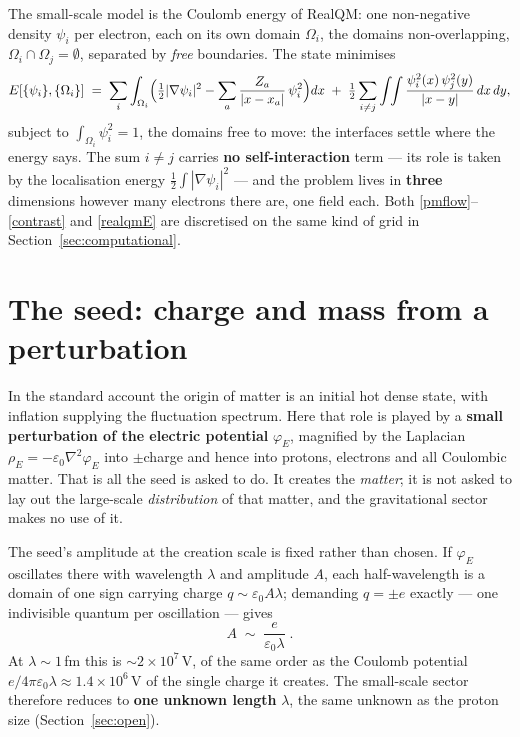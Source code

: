 \documentclass[11pt]{article}
\newcommand{\grad}{\nabla}
\newcommand{\half}{\tfrac{1}{2}}
\begin{document}
The small-scale model is the Coulomb energy of RealQM: one non-negative density $\psi_i$ per electron, each on its
own domain $\Omega_i$, the domains non-overlapping, $\Omega_i\cap\Omega_j=\emptyset$, separated by \emph{free}
boundaries. The state minimises
\begin{equation}\label{realqmE}
E[\{\psi_i\},\{\Omega_i\}]\;=\;\sum_i\int_{\Omega_i}\Bigl(\half|\grad\psi_i|^2-\sum_a\frac{Z_a}{|x-x_a|}\,
\psi_i^2\Bigr)dx\;+\;\half\sum_{i\neq j}\int\!\!\int\frac{\psi_i^2(x)\,\psi_j^2(y)}{|x-y|}\,dx\,dy ,
\end{equation}
subject to $\int_{\Omega_i}\psi_i^2=1$, the domains free to move: the interfaces settle where the energy says. The
sum $i\neq j$ carries \textbf{no self-interaction} term --- its role is taken by the localisation energy
$\half\int|\grad\psi_i|^2$ --- and the problem lives in \textbf{three} dimensions however many electrons there
are, one field each. Both \eqref{pmflow}--\eqref{contrast} and \eqref{realqmE} are discretised on the same kind of
grid in Section~\ref{sec:computational}.

\section{The seed: charge and mass from a perturbation}\label{sec:principle}
In the standard account the origin of matter is an initial hot dense state, with inflation supplying the
fluctuation spectrum. Here that role is played by a \textbf{small perturbation of the electric potential}
$\varphi_E$, magnified by the Laplacian $\rho_E=-\varepsilon_0\grad^2\varphi_E$ into $\pm$charge and hence into
protons, electrons and all Coulombic matter. That is all the seed is asked to do. It creates the \emph{matter}; it
is not asked to lay out the large-scale \emph{distribution} of that matter, and the gravitational sector makes no
use of it.

The seed's amplitude at the creation scale is fixed rather than chosen. If $\varphi_E$ oscillates there with
wavelength $\lambda$ and amplitude $A$, each half-wavelength is a domain of one sign carrying charge
$q\sim\varepsilon_0A\lambda$; demanding $q=\pm e$ exactly --- one indivisible quantum per oscillation --- gives
\begin{equation}\label{amp}
A\;\sim\;\frac{e}{\varepsilon_0\lambda}\;.
\end{equation}
At $\lambda\sim1$\,fm this is ${\sim}2\times10^7$\,V, of the same order as the Coulomb potential
$e/4\pi\varepsilon_0\lambda\approx1.4\times10^6$\,V of the single charge it creates. The small-scale sector
therefore reduces to \textbf{one unknown length} $\lambda$, the same unknown as the proton size
(Section~\ref{sec:open}).
\end{document}
